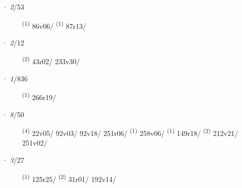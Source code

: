 \noindent{} · \textit{2}/53 \LEMMALINE
\begin{description}
    \item[]  \textsuperscript{(1)} \mbox{86v06/} \CASEBREAK {} \textsuperscript{(1)} \mbox{87r13/}
\end{description}
\ENTRYEND
\noindent{} · \textit{2}/12 \LEMMALINE
\begin{description}
    \item[]  \textsuperscript{(2)} \mbox{43r02/} \mbox{233v30/}
\end{description}
\ENTRYEND
\noindent{} · \textit{1}/836 \LEMMALINE
\begin{description}
    \item[]  \textsuperscript{(1)} \mbox{266r19/}
\end{description}
\ENTRYEND
\noindent{} · \textit{8}/50 \LEMMALINE
\begin{description}
    \item[]  \textsuperscript{(4)} \mbox{22v05/} \mbox{92v03/} \mbox{92v18/} \mbox{251r06/} \textsuperscript{(1)} \mbox{258v06/} \CASEBREAK {} \textsuperscript{(1)} \mbox{149r18/} \textsuperscript{(2)} \mbox{212v21/} \mbox{251v02/}
\end{description}
\ENTRYEND
\noindent{} · \textit{3}/27 \LEMMALINE
\begin{description}
    \item[]  \textsuperscript{(1)} \mbox{125r25/} \CASEBREAK {} \textsuperscript{(2)} \mbox{31r01/} \mbox{192v14/}
\end{description}
